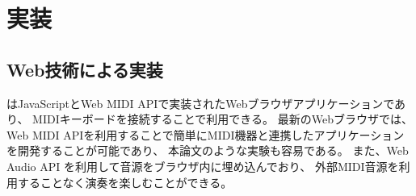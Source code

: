 \section{実装}

\subsection{Web技術による実装}

{\system}はJavaScriptとWeb MIDI API\cite{webmidi}で実装されたWebブラウザアプリケーションであり、
MIDIキーボードを接続することで利用できる。
最新のWebブラウザでは、Web MIDI APIを利用することで簡単にMIDI機器と連携したアプリケーションを開発することが可能であり、
本論文のような実験も容易である。
また、Web Audio API\cite{webaudio} を利用して音源をブラウザ内に埋め込んでおり、
外部MIDI音源を利用することなく演奏を楽しむことができる。
